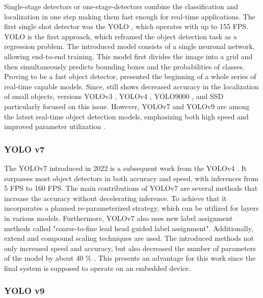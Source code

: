 Single-stage detectors or one-stage-detectors combine the classification and localization in one step making them fast enough for real-time applications.
The first single shot detector was the \ac{YOLO} \cite{YOLOv1}, which operates with up to 155 FPS.
\ac{YOLO} is the first approach, which reframed the object detection task as a regression problem.
The introduced model consists of a single neuronal network, allowing end-to-end training.
This model first divides the image into a grid and then simultaneously predicts bounding boxes and the probabilities of classes.
Proving to be a fast object detector, \cite{YOLOv1} presented the beginning of a whole series of real-time capable models.
Since, \cite{YOLOv1} still shows decreased accuracy in the localization of small objects, versions \ac{YOLO}v3 \cite{yolov3}, \ac{YOLO}v4 \cite{yolov4}, \ac{YOLO}9000 \cite{yolo9000}, and \ac{SSD} \cite{SSD_model} particularly focused on this issue.
However, \ac{YOLO}v7 \cite{yolov7} and \ac{YOLO}v9 \cite{YOLOv9} are among the latest real-time object detection models, emphasizing both high speed and improved parameter utilization \cite{20yearsSurvey} \cite{surveyObjectDetection} \cite{surveyObjectDetection2019} \cite{realTimeObjectDetection}.

\subsubsection{YOLO v7}
\label{subsubsec:YOLOv7}

The \ac{YOLO}v7 \cite{yolov7} introduced in 2022 is a subsequent work from the \ac{YOLO}v4 \cite{yolov4}.
It surpasses most object detectors in both accuracy and speed, with inferences from 5 FPS to 160 FPS.
The main contributions of \ac{YOLO}v7 \cite{yolov7} are several methods that increase the accuracy without decelerating inference.
To achieve that it incorporates a planned re-parameterized strategy, which can be utilized for layers in various models.
Furthermore, \ac{YOLO}v7 \cite{yolov7} also uses new label assignment methods called "coarse-to-fine lead head guided label assignment".
Additionally, extend and compound scaling techniques are used.
The introduced methods not only increased speed and accuracy, but also decreased the number of parameters of the model by about 40 \% \cite{yolov7}.
This presents an advantage for this work since the final system is supposed to operate on an embedded device.

\subsubsection{YOLO v9}
\label{subsubsec:YOLOv9}


